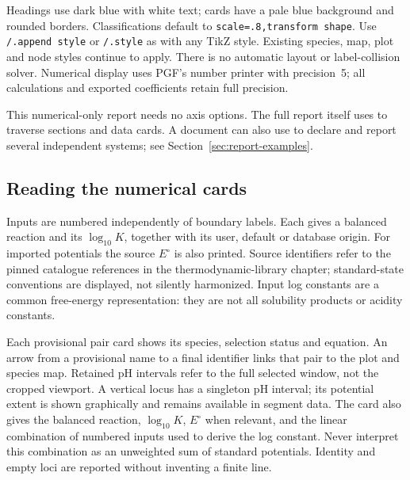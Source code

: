 \documentclass[a4paper,11pt]{ltxdoc}
\begin{document}
Headings use dark blue with white text; cards have a pale blue background and
rounded borders. Classifications default to \texttt{scale=.8,transform shape}.
Use \texttt{/.append style} or \texttt{/.style} as with any TikZ style. Existing
species, map, plot and node styles continue to apply. There is no automatic
layout or label-collision solver. Numerical display uses PGF's number printer
with precision~5; all calculations and exported coefficients retain full precision.

\begin{codeexample}
\begingroup
{}
\let\saved\pgfplotslastpourbaix
{}
\pgfplotspourbaixreport[
  handle/.expanded=\saved,
  sections={header,inputs,constants,boundaries},
  text width=10cm
]{}
\endgroup
\end{codeexample}
This numerical-only report needs no axis options. The full report itself uses
 to traverse sections and data cards. A document can also use
 to declare and report several independent systems; see Section~\ref{sec:report-examples}.

\subsection{Reading the numerical cards}
Inputs are numbered independently of boundary labels. Each gives a balanced
reaction and its $\log_{10}K$, together with its user, default or database origin.
For imported potentials the source $E^\circ$ is also printed. Source identifiers
refer to the pinned catalogue references in the thermodynamic-library chapter;
standard-state conventions are displayed, not silently harmonized. Input log
constants are a common free-energy representation: they are not all solubility
products or acidity constants.

Each provisional pair card shows its species, selection status and equation.
An arrow from a provisional name to a final identifier links that pair to the
plot and species map. Retained pH intervals refer to the full selected window,
not the cropped viewport. A vertical locus has a singleton pH interval; its
potential extent is shown graphically and remains available in segment data.
The card also gives the balanced reaction, $\log_{10}K$, $E^\circ$ when relevant,
and the linear combination of numbered inputs used to derive the log constant.
Never interpret this combination as an unweighted sum of standard potentials.
Identity and empty loci are reported without inventing a finite line.
\end{document}
